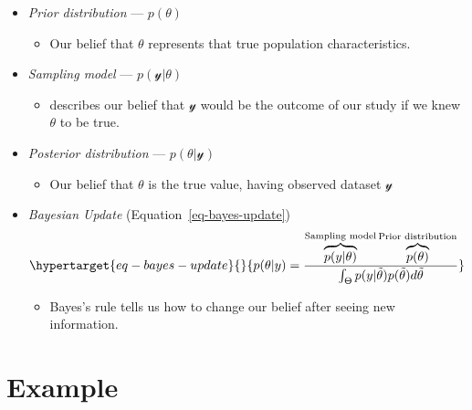 \documentclass[
  letterpaper,
  DIV=11,
  numbers=noendperiod]{scrreprt}
\providecommand{\tightlist}{%
  \setlength{\itemsep}{0pt}\setlength{\parskip}{0pt}}\usepackage{longtable,booktabs,array}
\begin{document}
\begin{itemize}
  \begin{itemize}
  \tightlist
  \item
    \emph{Prior distribution} --- \(p(\theta)\)

    \begin{itemize}
    \tightlist
    \item
      Our belief that \(\theta\) represents that true population
      characteristics.
    \end{itemize}
  \item
    \emph{Sampling model} --- \(p(\mathcal{y}|\theta)\)

    \begin{itemize}
    \tightlist
    \item
      describes our belief that \(\mathcal{y}\) would be the outcome of
      our study if we knew \(\theta\) to be true.
    \end{itemize}
  \item
    \emph{Posterior distribution} --- \(p(\theta|\mathcal{y})\)

    \begin{itemize}
    \tightlist
    \item
      Our belief that \(\theta\) is the true value, having observed
      dataset \(\mathcal{y}\)
    \end{itemize}
  \item
    \emph{Bayesian Update} (Equation~\ref{eq-bayes-update})
    \begin{equation}\protect\hypertarget{eq-bayes-update}{}{p(\theta|y) = \frac{\overbrace{p(y|\theta)}^{\text{Sampling model}}\overbrace{p(\theta)}^{\text{Prior distribution}}}{\int_{\Theta}p(y|\tilde{\theta})p(\tilde{\theta})d\tilde{\theta}}}\label{eq-bayes-update}\end{equation}

    \begin{itemize}
    \tightlist
    \item
      Bayes's rule tells us how to change our belief after seeing new
      information.
    \end{itemize}
  \end{itemize}
\end{itemize}

\hypertarget{example}{%
\section{Example}\label{example}}
\end{document}
